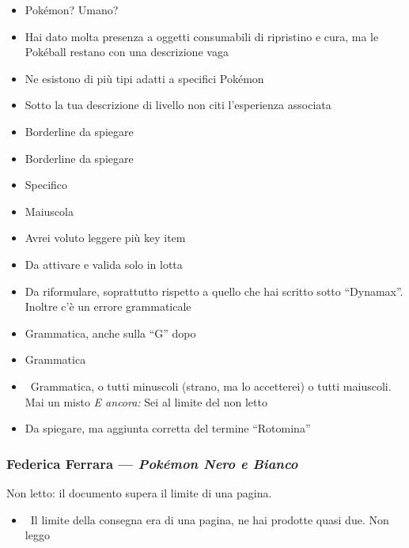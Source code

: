 {\begin{itemize}
  \item {} Pokémon? Umano?
  \item {} Hai dato molta presenza a oggetti consumabili di ripristino e cura, ma le Pokéball restano con una descrizione vaga
  \item {} Ne esistono di più tipi adatti a specifici Pokémon
  \item {} Sotto la tua descrizione di livello non citi l'esperienza associata
  \item {} Borderline da spiegare
  \item {} Borderline da spiegare
  \item {} Specifico
  \item {} Maiuscola
  \item {} Avrei voluto leggere più key item
  \item {} Da attivare e valida solo in lotta
  \item {} Da riformulare, soprattutto rispetto a quello che hai scritto sotto ``Dynamax''. Inoltre c'è un errore grammaticale
  \item {} Grammatica, anche sulla ``G'' dopo
  \item {} Grammatica
  \item {} \rvAvviso\ Grammatica, o tutti minuscoli (strano, ma lo accetterei) o tutti maiuscoli. Mai un misto \emph{E ancora:} Sei al limite del non letto
  \item {} Da spiegare, ma aggiunta corretta del termine ``Rotomina''
\end{itemize}
}

\subsubsection{Federica Ferrara --- \emph{Pokémon Nero e Bianco}}
Non letto: il documento supera il limite di una pagina.
{\small
\begin{itemize}
  \item {} \rvAvviso\ Il limite della consegna era di una pagina, ne hai prodotte quasi due. Non leggo
\end{itemize}
}

